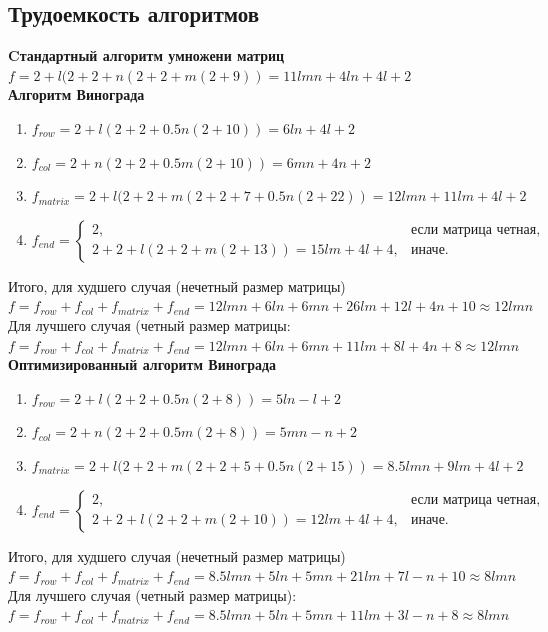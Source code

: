 \documentclass[a4paper,12pt]{article}
\begin{document}
	\begin{center}
		\subsection{Трудоемкость алгоритмов}
	\end{center}	    
    \textbf{Cтандартный алгоритм умножени матриц}
	$f = 2 + l(2 + 2 + n(2 + 2 + m(2 + 9)) = 11lmn + 4ln + 4l + 2$\\
	\textbf{Алгоритм Винограда}
	\begin{enumerate}
	\item $f_{row} = 2 + l(2 + 2 + 0.5n(2 + 10)) = 6ln + 4l + 2$
	\item $f_{col} = 2 + n(2 + 2 + 0.5m(2 + 10)) = 6mn + 4n + 2$
	\item $f_{matrix} = 2 + l(2 + 2 + m(2 + 2 + 7 + 0.5n(2 + 22)) = 12lmn + 11lm + 4l + 2$
	\item $f_{end} = \begin{cases}
	2, & \text{если матрица четная,}\\
	2 + 2 + l(2 + 2 + m(2 + 13)) = 15lm + 4l + 4, & \text{иначе.}
	\end{cases}$
	\end{enumerate}
	Итого, для худшего случая (нечетный размер матрицы) $f = f_{row} + f_{col} + f_{matrix} + f_{end} = 12lmn + 6ln + 6mn + 26lm + 12l + 4n + 10 \approx 12lmn$\\
	Для лучшего случая (четный размер матрицы: $f = f_{row} + f_{col} + f_{matrix} + f_{end} = 12lmn + 6ln + 6mn + 11lm + 8l + 4n + 8 \approx 12lmn$\\
	\textbf{Оптимизированный алгоритм Винограда}
	\begin{enumerate}
	\item $f_{row} = 2 + l(2 + 2 + 0.5n(2 + 8)) = 5ln - l + 2$
	\item $f_{col} = 2 + n(2 + 2 + 0.5m(2 + 8)) = 5mn - n + 2$
	\item $f_{matrix} = 2 + l(2 + 2 + m(2 + 2 + 5 + 0.5n(2 + 15)) = 8.5lmn + 9lm + 4l + 2$
	\item $f_{end} = \begin{cases}
	2, & \text{если матрица четная,}\\
	2 + 2 + l(2 + 2 + m(2 + 10)) = 12lm + 4l + 4, & \text{иначе.}
	\end{cases}$
	\end{enumerate}
	Итого, для худшего случая (нечетный размер матрицы) $f = f_{row} + f_{col} + f_{matrix} + f_{end} = 8.5lmn + 5ln + 5mn + 21lm + 7l - n + 10 \approx 8lmn$\\
	Для лучшего случая (четный размер матрицы): $f = f_{row} + f_{col} + f_{matrix} + f_{end} = 8.5lmn + 5ln + 5mn + 11lm + 3l - n + 8 \approx 8lmn$\\
	    
\end{document}
